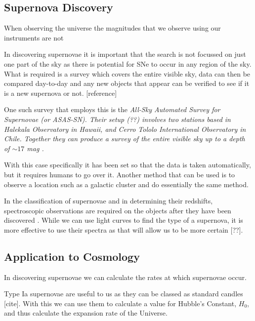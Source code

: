 \documentclass[twocolumn]{revtex4}
\begin{document}
\vspace{-3ex}
\subsection{Supernova Discovery}
\vspace{-2ex}

When observing the universe the magnitudes that we observe using our instruments are not 

In discovering supernovae it is important that the search is not focussed on just one part of the sky as there is potential for SNe to occur in any region of the sky. What is required is a survey which covers the entire visible sky, data can then be compared day-to-day and any new objects that appear can be verified to see if it is a new supernova or not. [reference] 

One such survey that employs this is the \em{All-Sky Automated Survey for Supernovae }\em (or ASAS-SN). Their setup (??) involves two stations based in Halekala Observatory in Hawaii, and Cerro Tololo International Observatory in Chile. Together they can produce a survey of the entire visible sky up to a depth of $\sim 17$ mag \cite{asn_lc}.

With this case specifically it has been set so that the data is taken automatically, but it requires humans to go over it. Another method that can be used is to observe a location such as a galactic cluster and do essentially the same method.

In the classification of supernovae and in determining their redshifts, spectroscopic observations are required on the objects after they have been discovered \cite{lascumbres}. While we can use light curves to find the type of a supernova, it is more effective to use their spectra as that will allow us to be more certain [??].

\vspace{-3ex}
\subsection{Application to Cosmology} \label{appcosmo}
\vspace{-2ex}

In discovering supernovae we can calculate the rates at which supernovae occur.

Type Ia supernovae are useful to us as they can be classed as standard candles [cite]. With this we can use them to calculate a value for Hubble's Constant, $H_0$, and thus calculate the expansion rate of the Universe.
\end{document}
